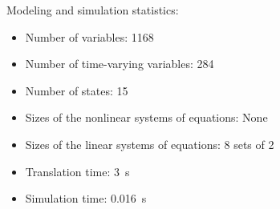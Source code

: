 \begin{contextbox}
  Modeling and simulation statistics:
  \begin{itemize}
    \item Number of variables: 1168
    \item Number of time-varying variables: 284
    \item Number of states: 15
    \item Sizes of the nonlinear systems of equations: None
    \item Sizes of the linear systems of equations: 8 sets of 2
    \item Translation time: \SI{3}{s}
    \item Simulation time: \SI{0.016}{s}
  \end{itemize}
\end{contextbox}